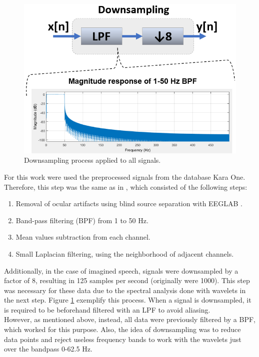\begin{figure}[h!]
	\includegraphics[scale=0.4]{Figures/Downsampling.png}
	\centering
	\caption{Downsampling process applied to all signals.}
	\label{Fig: Downsampling}
\end{figure}
For this work were used the preprocessed signals from the database Kara One. Therefore, this step was the same as in \cite{zhao2015classifying,zhao2013combining}, which consisted of the following steps:
\begin{enumerate}
	\item Removal of ocular artifacts using blind source separation with EEGLAB \cite{delorme2004eeglab}.
	\item Band-pass filtering (BPF) from 1 to 50 Hz.
	\item Mean values subtraction from each channel.
	\item Small Laplacian filtering, using the neighborhood of adjacent channels.
\end{enumerate}

Additionally, in the case of imagined speech, signals were downsampled by a factor of 8, resulting in 125 samples per second (originally were 1000). This step was necessary for these data due to the spectral analysis done with wavelets in the next step. Figure \ref{Fig: Downsampling} exemplify this process. When a signal is downsampled, it is required to be beforehand filtered with an LPF to avoid aliasing.\\

However, as mentioned above, instead, all data were previously filtered by a BPF, which worked for this purpose. Also, the idea of downsampling was to reduce data points and reject useless frequency bands to work with the wavelets just over the bandpass 0-62.5 Hz.
